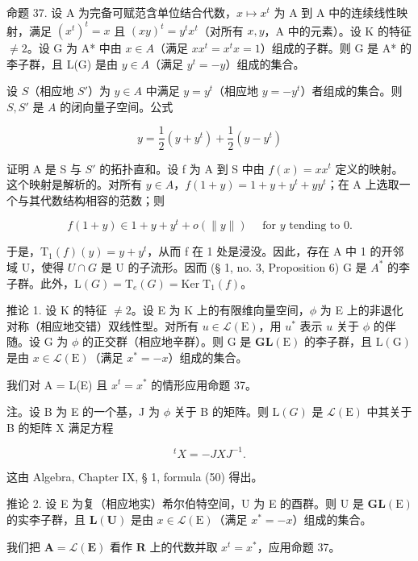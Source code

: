 命题 37. 设 A 为完备可赋范含单位结合代数，\(x \mapsto x^t\) 为 A 到 A 中的连续线性映射，满足 \((x^t)^t = x\) 且 \((xy)^t = y^t x^t\)（对所有 \(x, y\)，A 中的元素）。设 K 的特征 \(\neq 2\)。设 G 为 A* 中由 \(x \in A\)（满足 \(xx^t = x^t x = 1\)）组成的子群。则 G 是 A* 的李子群，且 L(G) 是由 \(y \in A\)（满足 \(y^t = -y\)）组成的集合。

设 \(S\)（相应地 \(S'\)）为 \(y \in A\) 中满足 \(y = y^t\)（相应地 \(y = -y^t\)）者组成的集合。则 \(S, S'\) 是 \(A\) 的闭向量子空间。公式

\[
y = \frac {1}{2} (y + y ^ {t}) + \frac {1}{2} (y - y ^ {t})
\]

证明 A 是 S 与 \(S'\) 的拓扑直和。设 f 为 A 到 S 中由 \(f(x) = xx^{t}\) 定义的映射。这个映射是解析的。对所有 \(y \in A\)，\(f(1 + y) = 1 + y + y^{t} + yy^{t}\)；在 A 上选取一个与其代数结构相容的范数；则

\[
f (1 + y) \in 1 + y + y ^ {t} + o (\| y \|) \quad \text { for   } y \text {   tending   to   } 0.
\]

于是，\(\mathrm{T}_{1}(f)(y)=y+y^{t}\)，从而 f 在 1 处是浸没。因此，存在 A 中 1 的开邻域 U，使得 \(U\cap G\) 是 U 的子流形。因而 (§ 1, no. 3, Proposition 6) G 是 \(A^{*}\) 的李子群。此外，\(\mathrm{L}(G)=\mathrm{T}_{e}(G)=\mathrm{Ker}\;\mathrm{T}_{1}(f)\)。

推论 1. 设 K 的特征 \(\neq 2\)。设 E 为 K 上的有限维向量空间，\(\phi\) 为 E 上的非退化对称（相应地交错）双线性型。对所有 \(u \in \mathcal{L}(\mathrm{E})\)，用 \(u^*\) 表示 \(u\) 关于 \(\phi\) 的伴随。设 G 为 \(\phi\) 的正交群（相应地辛群）。则 G 是 \(\mathbf{GL}(\mathrm{E})\) 的李子群，且 \(\mathrm{L}(\mathrm{G})\) 是由 \(x \in \mathcal{L}(\mathrm{E})\)（满足 \(x^* = -x\)）组成的集合。

我们对 A = L(E) 且 \(x^{t} = x^{*}\) 的情形应用命题 37。

注。设 B 为 E 的一个基，J 为 \(\phi\) 关于 B 的矩阵。则 \(\mathrm{L}(G)\) 是 \(\mathcal{L}(\mathrm{E})\) 中其关于 B 的矩阵 X 满足方程

\[
{ } ^ { t } X = - J X J ^ { - 1 } .
\]

这由 Algebra, Chapter IX, § 1, formula (50) 得出。

推论 2. 设 E 为复（相应地实）希尔伯特空间，U 为 E 的酉群。则 U 是 \(\mathbf{GL}(\mathrm{E})\) 的实李子群，且 \(\mathbf{L}(\mathbf{U})\) 是由 \(x \in \mathcal{L}(\mathrm{E})\)（满足 \(x^{*} = -x\)）组成的集合。

我们把 \(\mathbf{A} = \mathcal{L}(\mathbf{E})\) 看作 \(\mathbf{R}\) 上的代数并取 \(x^t = x^*\)，应用命题 37。

